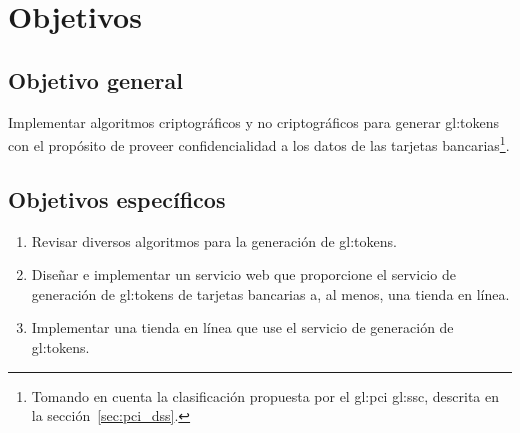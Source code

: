 %
%
%

\section{Objetivos}
\label{sec:objetivos}

\subsection{Objetivo general}

Implementar algoritmos criptográficos y no criptográficos para generar
\glspl{gl:token} con el propósito de proveer confidencialidad a los datos de las
tarjetas bancarias\footnote{Tomando en cuenta la clasificación propuesta por el
\gls{gl:pci} \gls{gl:ssc}, descrita en la sección~\ref{sec:pci_dss}.}.

\subsection{Objetivos específicos}

\begin{enumerate}
  \item Revisar diversos algoritmos para la generación de \glspl{gl:token}.
  \item Diseñar e implementar un servicio web que proporcione el servicio de
    generación de \glspl{gl:token} de tarjetas bancarias a, al menos, una tienda
    en línea.
  \item Implementar una tienda en línea que use el servicio de generación de
    \glspl{gl:token}.
\end{enumerate}
